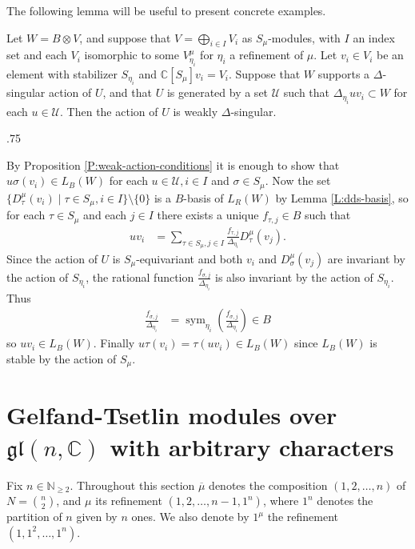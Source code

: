\documentclass[11pt,fleqn]{article}
\makeatletter
\newcounter{para}[section]
\renewenvironment{proof}[1][\textit{Proof}]{\par
  \pushQED{\qed}%
  \normalfont \topsep.75\paraskip\relax
  \trivlist
  \item[\hskip\labelsep
        \itshape
    #1\@addpunct{.}]\ignorespaces
}{%
  \popQED\endtrivlist\@endpefalse
}
\newcommand\NN{\mathbb N}
\newcommand\CC{\mathbb C}
\newcommand\ot{\otimes}
\newcommand\gl{\mathfrak{gl}}
\DeclareMathOperator\sym{sym}
\makeatother
\begin{document}
The following lemma will be useful to present concrete examples.
\begin{Lemma}
\label{L:induced}
Let $W = B \ot V$, and suppose that $V = \bigoplus_{i \in I} V_i$ as 
$S_\mu$-modules, with $I$ an index set and each $V_i$ isomorphic to some 
$V^\mu_{\eta_i}$ for $\eta_i$ a refinement of $\mu$. Let $v_i \in V_i$
be an element with stabilizer $S_{\eta_i}$ and $\CC[S_\mu] v_i = V_i$.
Suppose that $W$ supports a $\Delta$-singular action of $U$, and that
$U$ is generated by a set $\mathcal U$ such that 
$\Delta_{\eta_i} u v_i \subset W$ for each $u \in \mathcal U$. Then the action 
of $U$ is weakly $\Delta$-singular.
\end{Lemma}
\begin{proof}
By Proposition \ref{P:weak-action-conditions} it is enough to show that $u 
\sigma(v_i) \in L_B(W)$ for each $u \in \mathcal U, i \in I$ and $\sigma \in 
S_\mu$. Now the set $\{D^\mu_\tau (v_i) \mid \tau \in S_\mu, i \in I\} 
\setminus \{0\}$ is a $B$-basis of $L_R(W)$ by Lemma \ref{L:dds-basis}, so for 
each $\tau \in S_\mu$ and each $j \in I$ there exists a unique $f_{\tau,j} \in 
B$ such that
\begin{align*}
 u v_i
  &= \sum_{\tau \in S_\mu, j \in I} 
    \frac{f_{\tau,j}} {\Delta_{\eta_i}} D^\mu_\tau(v_j). 
\end{align*}
Since the action of $U$ is $S_\mu$-equivariant and both $v_i$ and 
$D^\mu_\sigma(v_j)$ are invariant by the action of $S_{\eta_i}$, the rational
function $\frac{f_{\sigma,j}} {\Delta_{\eta_i}}$ is also invariant by the 
action of $S_{\eta_i}$. Thus
\begin{align*}
\frac{f_{\sigma,j}} {\Delta_{\eta_i}}
  &=\sym_{\eta_i}\left(\frac{f_{\sigma,j}} {\Delta_{\eta_i}}\right) \in B
\end{align*}
so $u v_i \in L_B(W)$. Finally $u \tau(v_i) = \tau (u v_i) \in L_B(W)$ since
$L_B(W)$ is stable by the action of $S_\mu$.
\end{proof}

\section{Gelfand-Tsetlin modules over $\gl(n,\CC)$ with arbitrary characters}
\label{GT-arbitrary-characters}
Fix $n \in \NN_{\geq 2}$. Throughout this section $\overline \mu$ denotes the 
composition $(1,2, \ldots, n)$ of $N = \binom{n}{2}$, and $\mu$ its refinement 
$(1,2 ,\ldots, n-1, 1^n)$, where $1^n$ denotes the partition of $n$ given by 
$n$ ones. We also denote by $1^\mu$ the refinement $(1,1^2, \ldots, 1^n)$.
\end{document}
